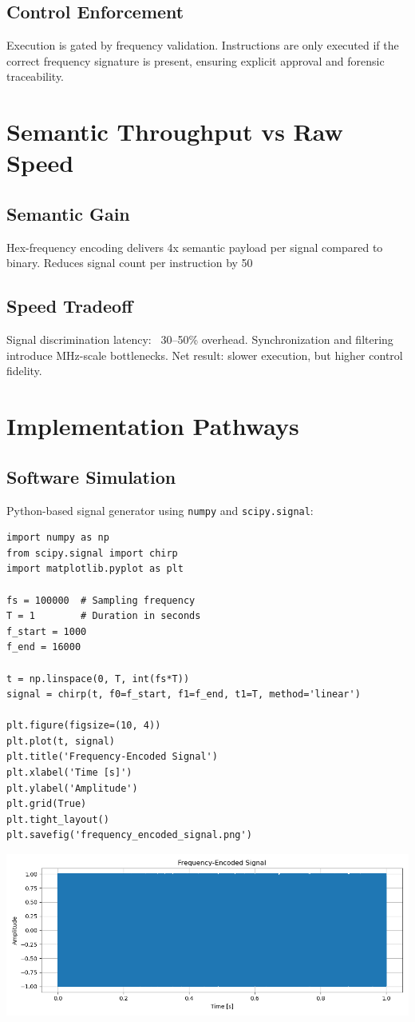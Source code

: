 \documentclass[12pt]{article}
\begin{document}
\subsection{Control Enforcement}
Execution is gated by frequency validation. Instructions are only executed if the correct frequency signature is present, ensuring explicit approval and forensic traceability.

\section{Semantic Throughput vs Raw Speed}
\subsection{Semantic Gain}
Hex-frequency encoding delivers 4x semantic payload per signal compared to binary. Reduces signal count per instruction by 50%

\subsection{Speed Tradeoff}
Signal discrimination latency: ~30–50\% overhead. Synchronization and filtering introduce MHz-scale bottlenecks. Net result: slower execution, but higher control fidelity.

\section{Implementation Pathways}
\subsection{Software Simulation}
Python-based signal generator using \texttt{numpy} and \texttt{scipy.signal}:
\begin{verbatim}
import numpy as np
from scipy.signal import chirp
import matplotlib.pyplot as plt

fs = 100000  # Sampling frequency
T = 1        # Duration in seconds
f_start = 1000
f_end = 16000

t = np.linspace(0, T, int(fs*T))
signal = chirp(t, f0=f_start, f1=f_end, t1=T, method='linear')

plt.figure(figsize=(10, 4))
plt.plot(t, signal)
plt.title('Frequency-Encoded Signal')
plt.xlabel('Time [s]')
plt.ylabel('Amplitude')
plt.grid(True)
plt.tight_layout()
plt.savefig('frequency_encoded_signal.png')
\end{verbatim}
\includegraphics[width=\textwidth]{frequency_encoded_signal.png}
\end{document}
